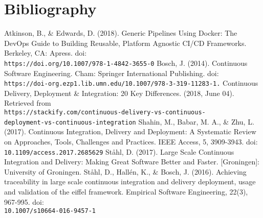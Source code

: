\documentclass[11pt,a4paper]{article}
\begin{document}
\section{Bibliography}
\begin{thebibliography}{6}
	 Atkinson, B., \& Edwards, D. (2018). Generic Pipelines Using Docker: The DevOps Guide to Building Reusable, Platform Agnostic CI/CD Frameworks. Berkeley, CA: Apress. doi:\\\texttt{https://doi.org/10.1007/978-1-4842-3655-0}
	 Bosch, J. (2014). Continuous Software Engineering. Cham: Springer International Publishing. doi:\\\texttt{https://doi-org.ezp1.lib.umn.edu/10.1007/978-3-319-11283-1.}
	 Continuous Delivery, Deployment \& Integration: 20 Key Differences. (2018, June 04). Retrieved from \\\texttt{https://stackify.com/continuous-delivery-vs-continuous-\\deployment-vs-continuous-integration}
	 Shahin, M., Babar, M. A., \& Zhu, L. (2017). Continuous Integration, Delivery and Deployment: A Systematic Review on Approaches, Tools, Challenges and Practices. IEEE Access, 5, 3909-3943. doi:\\\texttt{10.1109/access.2017.2685629}
	 St\aa hl, D. (2017). Large Scale Continuous Integration and Delivery: Making Great Software Better and Faster. [Groningen]: University of Groningen.
	 St\aa hl, D., Hall\'{e}n, K., \& Bosch, J. (2016). Achieving traceability in large scale continuous integration and delivery deployment, usage and validation of the eiffel framework. Empirical Software Engineering, 22(3), 967-995. doi:\\\texttt{10.1007/s10664-016-9457-1}
\end{thebibliography}
\end{document}
